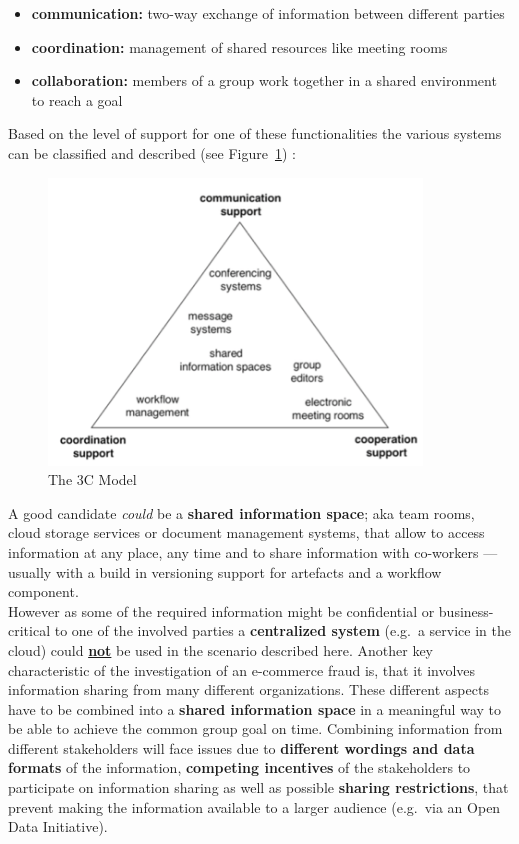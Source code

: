 \begin{itemize}
    \item\textbf{communication:} two-way exchange of information between different parties
    \item\textbf{coordination:} management of shared resources like meeting rooms
    \item\textbf{collaboration:} members of a group work together in a shared environment to reach a goal
\end{itemize}

Based on the level of support for one of these functionalities the various systems can be classified and described (see Figure~\ref{fig:images_3C_model}) \citep{Koch2008}:
\\

\begin{figure}[!ht]
	\centering
		\includegraphics[height=3in]{images/3C-model.png}
	\caption{The 3C Model \citep{Koch2008}}
\label{fig:images_3C_model}
\end{figure}

A good candidate \textit{could} be a \textbf{shared information space}; aka team rooms, cloud storage services or document management systems, that allow to access information at any place,
any time and to share information with co-workers --- usually with a build in versioning support for artefacts and a workflow component. \\

However as some of the required information might be confidential or business-critical to one of the involved parties a \textbf{centralized system} (e.g.\ a service in the cloud) could \textbf{\underline{not}} be used in the scenario described here.
Another key characteristic of the investigation of an e-commerce fraud is, that it involves information sharing from many different organizations. These different aspects have to be combined into a \textbf{shared information space} in a meaningful way
to be able to achieve the common group goal on time. Combining information from different stakeholders will face issues due to \textbf{different wordings and data formats} of the information,
\textbf{competing incentives} of the stakeholders to participate on information sharing as well as possible \textbf{sharing restrictions}, that prevent making the information available to a larger audience (e.g.\ via an Open Data Initiative). \\

